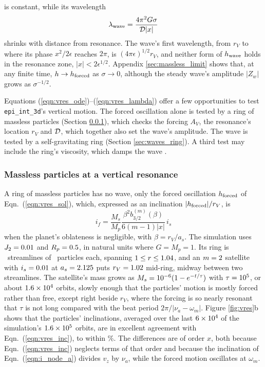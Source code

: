 \documentclass[twocolumn]{aastex702}
\newcommand{\code}[1]{\texttt{#1}}   %
\begin{document}
is constant, while its wavelength
\begin{equation}
    \label{eqn:vres_lambda}
    \lambda_{\rm wave} = \frac{4\pi^2G\sigma}{{\cal D}|x|}
\end{equation}
shrinks with distance from resonance. The wave's first wavelength, from $r_V$ to where its phase
$x^2/2\epsilon$ reaches $2\pi$, is $(4\pi\epsilon)^{1/2}r_V$, and neither form of $h_{\rm wave}$ holds in the
resonance zone, $|x| < 2\epsilon^{1/2}$. Appendix \ref{sec:massless_limit} shows that, at any finite time,
$h \rightarrow h_{\rm forced}$ as $\sigma \rightarrow 0$, although the steady wave's amplitude $|Z_w|$ grows as
$\sigma^{-1/2}$.

Equations (\ref{eqn:vres_ode})--(\ref{eqn:vres_lambda}) offer a few opportunities to test
\code{epi\_int\_3d}'s vertical motion. The forced oscillation alone is tested by a ring of massless
particles (Section \ref{sec:waves_massless}), which checks the forcing $A_V$, the resonance's location
$r_V$ and ${\cal D}$, which together also set the wave's amplitude. The wave is tested by a
self-gravitating ring (Section \ref{sec:waves_ring}). A third test may include the ring's viscosity,
which damps the wave \citep[Eqns.\ (97)--(98) of][]{S84}.

\subsubsection{Massless particles at a vertical resonance}
\label{sec:waves_massless}

A ring of massless particles has no wave, only the forced oscillation $h_{\rm forced}$ of Eqn.\ (\ref{eqn:vres_sol}),
which, expressed as an inclination $|h_{\rm forced}|/r_V$, is
\begin{equation}
    \label{eqn:vres_inc}
    i_f = \frac{M_s}{M_p}\frac{\beta^2b_{3/2}^{(m)}(\beta)}{6(m - 1)|x|}\,i_s
\end{equation}
when the planet's oblateness is negligible, with $\beta = r_V/a_s$. The simulation uses $J_2 = 0.01$ and $R_p = 0.5$, in
natural units where $G = M_p = 1$. Its ring is \vresNstreamlines\ streamlines of \vresNparticles\ particles each, spanning
$1 \le r \le 1.04$, and an $m = 2$ satellite with $i_s = 0.01$ at $a_s = 2.125$ puts $r_V = 1.02$
mid-ring, midway between two streamlines. The satellite's mass grows as $M_s = 10^{-6}(1 - e^{-t/\tau})$ with $\tau = 10^{5}$, or about
$1.6\times10^{4}$ orbits, slowly enough that the particles' motion is mostly forced rather than free, except right
beside $r_V$, where the forcing is so nearly resonant that $\tau$ is not long compared with the beat period
$2\pi/|\nu_a - \omega_m|$. Figure \ref{fig:vres}b shows that the particles' inclinations,
averaged over the last $6\times10^{4}$ of the simulation's $1.6\times10^{5}$ orbits, are in excellent agreement with
Eqn.\ (\ref{eqn:vres_inc}), to within \vresAgreePercent\%. The differences are of order $x$, both because
Eqn.\ (\ref{eqn:vres_inc}) neglects terms of that order and because the inclination of Eqn.\ (\ref{eqn:i_node_a})
divides $v_z$ by $\nu_a$, while the forced motion oscillates at $\omega_m$.
\end{document}
